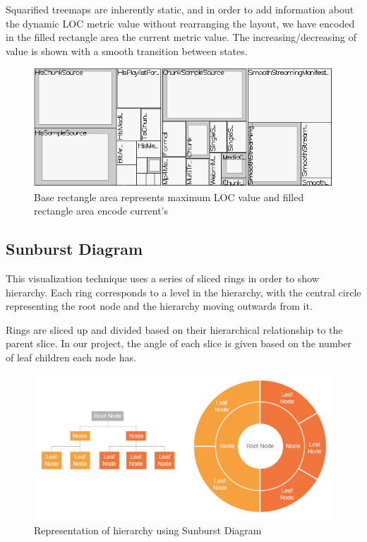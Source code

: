 Squarified treemaps are inherently static, and in order to add information about the dynamic LOC metric value without rearranging the layout, we have encoded in the filled rectangle area the current metric value. The increasing/decreasing of value is shown with a smooth transition between states.

\begin{figure}[H]
  \centering
  \includegraphics[width=1\textwidth]{figures/dynamic_treemap.png}
  \caption{Base rectangle area represents maximum LOC value and filled rectangle area encode current's}
  \label{fig:dynamic_treemap}
\end{figure}

\subsection{Sunburst Diagram}
This visualization technique uses a series of sliced rings in order to show hierarchy. Each ring corresponds to a level in the hierarchy, with the central circle representing the root node and the hierarchy moving outwards from it.

Rings are sliced up and divided based on their hierarchical relationship to the parent slice. In our project, the angle of each slice is given based on the number of leaf children each node has.

\begin{figure}[H]
  \centering
  \includegraphics[width=1\textwidth]{figures/sunburst_catalog.png}
  \caption{Representation of hierarchy using Sunburst Diagram}
  \label{fig:sunburst_catalog}
\end{figure}


